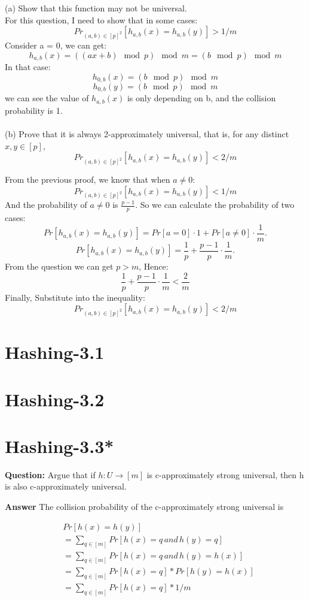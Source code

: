 \documentclass[12pt]{article}
\begin{document}
(a) Show that this function may not be universal.\\


For this question, I need to show that in some cases:
\[Pr_{(a,b)\in[p]^2}[h_{a,b}(x) = h_{a,b}(y)] > 1/m\]
Consider a = 0, we can get:
\[h_{a,b}(x) = ((ax + b)\mod{p} )\mod{m} = (b\mod{p} )\mod{m}\]
In that case:
\[h_{0,b}(x) = (b\mod{p} )\mod{m}\]
\[h_{0,b}(y) = (b\mod{p} )\mod{m}\]
we can see the value of \(h_{a,b}(x)\) is only depending on b, and the collision probability is 1.\\
\\
(b) Prove that it is always 2-approximately universal, that is, for any distinct \(x, y \in [p]\), 
\[Pr_{(a,b)\in[p]^2}[h_{a,b}(x) = h_{a,b}(y)] < 2/m\]


From the previous proof, we know that when \(a \neq 0\):
\[Pr_{(a,b)\in[p]^2}[h_{a,b}(x) = h_{a,b}(y)] < 1/m\]
And the probability of \(a \neq 0\) is \(\frac{p-1}{p}\).
So we can calculate the probability of two cases:
\[
Pr[h_{a,b}(x) = h_{a,b}(y)] = Pr[a = 0] \cdot 1 + Pr[a \neq 0] \cdot \frac{1}{m}.
\]
\[
Pr[h_{a,b}(x) = h_{a,b}(y)] = \frac{1}{p} + \frac{p-1}{p} \cdot \frac{1}{m}.
\]
From the question we can get \(p>m\), Hence:
\[\frac{1}{p} + \frac{p-1}{p} \cdot \frac{1}{m}<\frac{2}{m}\]
Finally, Substitute into the inequality:
\[Pr_{(a,b)\in[p]^2}[h_{a,b}(x) = h_{a,b}(y)] < 2/m\]




\section{Hashing-3.1}

\section{Hashing-3.2}

\section{Hashing-3.3* }
\textbf{Question: }
Argue that if $h: U \rightarrow [m]$ is c-approximately strong universal, then h is also c-approximately universal.

\textbf{Answer}
The collision probability of the c-approximately strong universal is 

\begin{equation}
\begin{aligned}
&Pr[h(x)=h(y)] \\
&= \sum_{q \in [m]} Pr[h(x) = q \, and \, h(y) = q]\\
&= \sum_{q \in [m]} Pr[h(x) = q \, and \, h(y) = h(x)]\\
&=\sum_{q \in [m]} Pr[h(x) = q] * Pr[h(y) = h(x)]\\
&=\sum_{q \in [m]} Pr[h(x) = q] *1/m
\end{aligned}
\end{equation}
\end{document}
